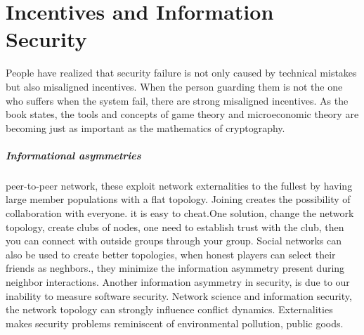\section{Incentives and Information Security}


People have realized that security failure is not only caused by technical mistakes but also misaligned incentives. When the person guarding them is not the one who suffers when the system fail, there are strong misaligned incentives. As the book \cite{anderson2010security} states, the tools and concepts of game theory and microeconomic theory are becoming just as important as the mathematics of cryptography.
\subparagraph{Informational asymmetries}
peer-to-peer network, these exploit network externalities to the fullest by having large member populations with a flat topology. Joining creates the possibility of collaboration with everyone. 
it is easy to cheat.One solution, change the network topology, create clubs of nodes, 
one need to establish trust with the club, then you can connect with outside groups through
 your group. Social networks can also be used to create better topologies, when honest players 
 can select their friends as neghbors., they minimize the information asymmetry present during
  neighbor interactions. 
Another information asymmetry in security, is due to our inability to measure software security. 
Network science and information security, the network topology can strongly influence conflict dynamics.
Externalities makes security problems reminiscent of environmental pollution, public goods. 


   
    
   
   
   
   
   
   
   
   
   
   
   
   
  

